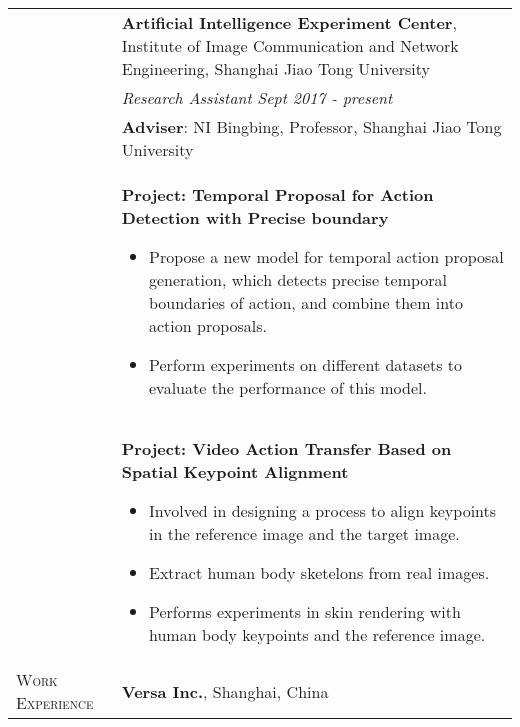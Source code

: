 \documentclass{article}
\begin{document}
\begin{tabular}{p{2.5cm}p{16cm}}
    &\textbf{Artificial Intelligence Experiment Center}, Institute of Image Communication and Network Engineering, Shanghai Jiao Tong University\\
    &\textit{Research Assistant} \hfill \textit{Sept 2017 - present}\\
    &\textbf{Adviser}: NI Bingbing, Professor, Shanghai Jiao Tong University\\
    &\textbf{Project: Temporal Proposal for Action Detection with Precise boundary}
    \begin{itemize}[leftmargin=1em, topsep=0.5em]
        \setlength{\itemsep}{0pt}
        \setlength{\parsep}{0pt}
        \setlength{\parskip}{0pt}
        \item Propose a new model for temporal action proposal generation, which detects precise temporal boundaries of action, and combine them into action proposals.
        \item Perform experiments on different datasets to evaluate the performance of this model.
    \end{itemize}\vspace{-0.5cm} \\
    &\textbf{Project: Video Action Transfer Based on Spatial Keypoint Alignment}
    \begin{itemize}[leftmargin=1em, topsep=0.5em]
        \setlength{\itemsep}{0pt}
        \setlength{\parsep}{0pt}
        \setlength{\parskip}{0pt}
        \item Involved in designing a process to align keypoints in the reference image and the target image.
        \item Extract human body sketelons from real images.
        \item Performs experiments in skin rendering with human body keypoints and the reference image.
    \end{itemize}\\
    
    
    
    
    {\textsc{Work \quad\quad\quad Experience}} & \textbf{Versa Inc.}, Shanghai, China
    

\end{tabular}
\end{document}
